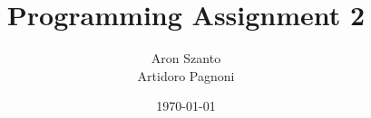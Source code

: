 \documentclass[11pt]{article}
\begin{document}
\title{Programming Assignment 2}
\author{Aron Szanto\\
 Artidoro Pagnoni}
\date{\today}
\maketitle
\end{document}
